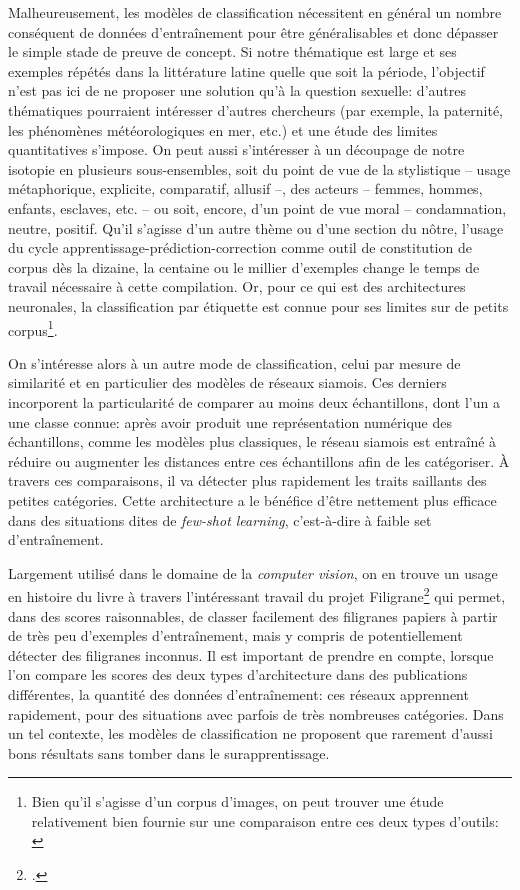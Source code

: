 Malheureusement, les modèles de classification nécessitent en général un nombre conséquent de données d'entraînement pour être généralisables et donc dépasser le simple stade de preuve de concept. Si notre thématique est large et ses exemples répétés dans la littérature latine quelle que soit la période, l'objectif n'est pas ici de ne proposer une solution qu'à la question sexuelle: d'autres thématiques pourraient intéresser d'autres chercheurs (par exemple, la paternité, les phénomènes météorologiques en mer, etc.) et une étude des limites quantitatives s'impose. On peut aussi s'intéresser à un découpage de notre isotopie en plusieurs sous-ensembles, soit du point de vue de la stylistique -- usage métaphorique, explicite, comparatif, allusif --, des acteurs -- femmes, hommes, enfants, esclaves, etc. -- ou soit, encore, d'un point de vue moral -- condamnation, neutre, positif. Qu'il s'agisse d'un autre thème ou d'une section du nôtre, l'usage du cycle apprentissage-prédiction-correction comme outil de constitution de corpus dès la dizaine, la centaine ou le millier d'exemples change le temps de travail nécessaire à cette compilation. Or, pour ce qui est des architectures neuronales, la classification par étiquette est connue pour ses limites sur de petits corpus\footnote{Bien qu'il s'agisse d'un corpus d'images, on peut trouver une étude relativement bien fournie sur une comparaison entre ces deux types d'outils: \cite{pasupa_comparison_2016}}. %

On s'intéresse alors à un autre mode de classification, celui par mesure de similarité et en particulier des modèles de réseaux siamois. Ces derniers incorporent la particularité de comparer au moins deux échantillons, dont l'un a une classe connue: après avoir produit une représentation numérique des échantillons, comme les modèles plus classiques, le réseau siamois est entraîné à réduire ou augmenter les distances entre ces échantillons afin de les catégoriser. À travers ces comparaisons, il va détecter plus rapidement les traits saillants des petites catégories. Cette architecture a le bénéfice d'être nettement plus efficace dans des situations dites de \textit{few-shot learning}, c'est-à-dire à faible set d'entraînement. 

Largement utilisé dans le domaine de la \textit{computer vision}, on en trouve un usage en histoire du livre à travers l'intéressant travail du projet Filigrane\footcite{shen_large-scale_2021} qui permet, dans des scores raisonnables, de classer facilement des filigranes papiers à partir de très peu d'exemples d'entraînement, mais y compris de potentiellement détecter des filigranes inconnus. Il est important de prendre en compte, lorsque l'on compare les scores des deux types d'architecture dans des publications différentes, la quantité des données d'entraînement: ces réseaux apprennent rapidement, pour des situations avec parfois de très nombreuses catégories. Dans un tel contexte, les modèles de classification ne proposent que rarement d'aussi bons résultats sans tomber dans le surapprentissage.

